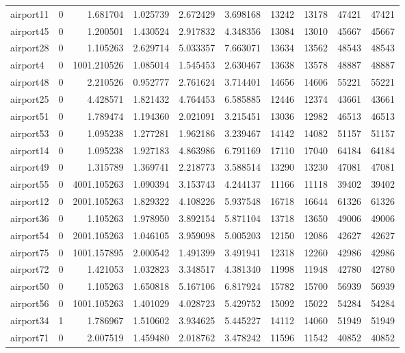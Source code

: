 \begin{longtable}{|l|r|r|r|r|r|r|r|r|r|}
airport11 & 0 & 1.681704 & 1.025739 & 2.672429 & 3.698168 & 13242 & 13178 & 47421 & 47421 \\
airport45 & 0 & 1.200501 & 1.430524 & 2.917832 & 4.348356 & 13084 & 13010 & 45667 & 45667 \\
airport28 & 0 & 1.105263 & 2.629714 & 5.033357 & 7.663071 & 13634 & 13562 & 48543 & 48543 \\
airport4 & 0 & 1001.210526 & 1.085014 & 1.545453 & 2.630467 & 13638 & 13578 & 48887 & 48887 \\
airport48 & 0 & 2.210526 & 0.952777 & 2.761624 & 3.714401 & 14656 & 14606 & 55221 & 55221 \\
airport25 & 0 & 4.428571 & 1.821432 & 4.764453 & 6.585885 & 12446 & 12374 & 43661 & 43661 \\
airport51 & 0 & 1.789474 & 1.194360 & 2.021091 & 3.215451 & 13036 & 12982 & 46513 & 46513 \\
airport53 & 0 & 1.095238 & 1.277281 & 1.962186 & 3.239467 & 14142 & 14082 & 51157 & 51157 \\
airport14 & 0 & 1.095238 & 1.927183 & 4.863986 & 6.791169 & 17110 & 17040 & 64184 & 64184 \\
airport49 & 0 & 1.315789 & 1.369741 & 2.218773 & 3.588514 & 13290 & 13230 & 47081 & 47081 \\
airport55 & 0 & 4001.105263 & 1.090394 & 3.153743 & 4.244137 & 11166 & 11118 & 39402 & 39402 \\
airport12 & 0 & 2001.105263 & 1.829322 & 4.108226 & 5.937548 & 16718 & 16644 & 61326 & 61326 \\
airport36 & 0 & 1.105263 & 1.978950 & 3.892154 & 5.871104 & 13718 & 13650 & 49006 & 49006 \\
airport54 & 0 & 2001.105263 & 1.046105 & 3.959098 & 5.005203 & 12150 & 12086 & 42627 & 42627 \\
airport75 & 0 & 1001.157895 & 2.000542 & 1.491399 & 3.491941 & 12318 & 12260 & 42986 & 42986 \\
airport72 & 0 & 1.421053 & 1.032823 & 3.348517 & 4.381340 & 11998 & 11948 & 42780 & 42780 \\
airport50 & 0 & 1.105263 & 1.650818 & 5.167106 & 6.817924 & 15782 & 15700 & 56939 & 56939 \\
airport56 & 0 & 1001.105263 & 1.401029 & 4.028723 & 5.429752 & 15092 & 15022 & 54284 & 54284 \\
airport34 & 1 & 1.786967 & 1.510602 & 3.934625 & 5.445227 & 14112 & 14060 & 51949 & 51949 \\
airport71 & 0 & 2.007519 & 1.459480 & 2.018762 & 3.478242 & 11596 & 11542 & 40852 & 40852 \\

\end{longtable}
